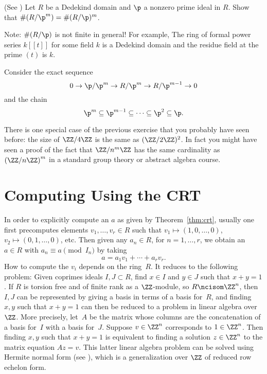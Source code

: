 \begin{exercise}\label{ex:residuefieldofpower}(See \cite[Thm.~22(a)]{marcus1977number}) %
  Let $R$ be a Dedekind domain and $\p$ a nonzero prime ideal in $R$.
  Show that $\#(R/\p^m) = \#(R/\p)^m$.

  Note: $\#(R/\p)$ is not finite in general! For example,
  The ring of formal power series $k[[t]]$ for some field $k$
  is a Dedekind domain and the residue field at the prime $(t)$
  is $k$.

  \begin{hint}
    Consider the exact sequence
    $$
      0\to \p/\p^{m} \to R/\p^{m} \to R/\p^{m-1} \to 0
    $$
    and the chain
    $$
      \p^m \subseteq \p^{m-1}
      \subseteq \cdots \subseteq \p^2 \subseteq \p.
    $$
  \end{hint}
\end{exercise}

\begin{remark}
  There is one special case of the previous exercise that you probably
  have seen before: the size of $\ZZ/4\ZZ$ is the same as
  $(\ZZ/2\ZZ)^2$. In fact you might have seen a proof of
  the fact that $\ZZ/n^m\ZZ$ has the same cardinality as $\left(\ZZ/n\ZZ\right)^m$
  in a standard group theory or abstract algebra course.
\end{remark}

\section{Computing Using the CRT}
In order to explicitly compute an $a$ as given by Theorem~\ref{thm:crt},
usually one first precomputes elements $v_1, \dots, v_r \in R$ such that
$v_1 \mapsto (1,0, \dots, 0)$,
$v_2 \mapsto (0,1, \dots, 0)$, etc.
Then given any $a_n \in R$, for $n=1, \dots, r$, we obtain an $a \in R$
with $a_n \equiv a\pmod{I_n}$ by taking
$$
  a = a_1 v_1 + \cdots + a_r v_r.
$$
How to compute the $v_i$ depends on the ring~$R$.   It reduces to
the following problem: Given coprimes ideals $I,J \subset R$, find
$x\in I$ and $y\in J$ such that $x+y=1$.   If $R$ is torsion free and
of finite rank
as a $\ZZ$-module, so $R\ncisom \ZZ^n$,
then $I, J$ can be represented by giving a basis in terms of a basis
for~$R$, and finding $x,y$ such  that $x+y=1$ can then be reduced to
a problem in linear algebra over~$\ZZ$.
More precisely, let~$A$
be the matrix whose columns are the concatenation of a basis for~$I$
with a basis for~$J$.
Suppose $v\in \ZZ^n$ corresponds to $1\in\ZZ^n$.
Then finding $x,y$ such that $x+y=1$ is equivalent to
finding a solution $z\in \ZZ^n$ to the matrix equation
$Az = v$. This latter linear algebra problem
can be solved using Hermite normal form
(see \cite[\S4.7.1]{cohen:course_ant}),
which is a generalization over $\ZZ$
of reduced row echelon form.

